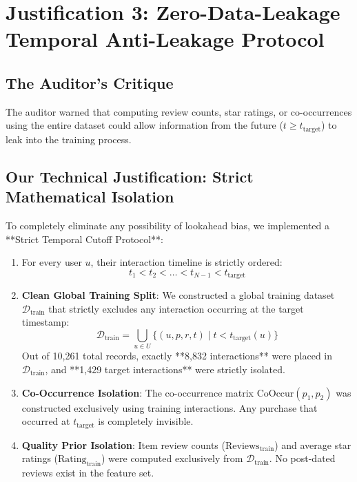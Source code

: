 \documentclass[11pt,a4paper]{article}
\begin{document}
\section{Justification 3: Zero-Data-Leakage Temporal Anti-Leakage Protocol}

\subsection{The Auditor's Critique}
The auditor warned that computing review counts, star ratings, or co-occurrences using the entire dataset could allow information from the future ($t \ge t_{\text{target}}$) to leak into the training process.

\subsection{Our Technical Justification: Strict Mathematical Isolation}
To completely eliminate any possibility of lookahead bias, we implemented a **Strict Temporal Cutoff Protocol**:
\begin{enumerate}
    \item For every user $u$, their interaction timeline is strictly ordered:
    \begin{equation}
        t_1 < t_2 < \dots < t_{N-1} < t_{\text{target}}
    \end{equation}
    \item \textbf{Clean Global Training Split}: We constructed a global training dataset $\mathcal{D}_{\text{train}}$ that strictly excludes any interaction occurring at the target timestamp:
    \begin{equation}
        \mathcal{D}_{\text{train}} = \bigcup_{u \in U} \{ (u, p, r, t) \mid t < t_{\text{target}}(u) \}
    \end{equation}
    Out of 10,261 total records, exactly **8,832 interactions** were placed in $\mathcal{D}_{\text{train}}$, and **1,429 target interactions** were strictly isolated.
    \item \textbf{Co-Occurrence Isolation}: The co-occurrence matrix $\text{CoOccur}(p_1, p_2)$ was constructed exclusively using training interactions. Any purchase that occurred at $t_{\text{target}}$ is completely invisible.
    \item \textbf{Quality Prior Isolation}: Item review counts ($\text{Reviews}_{\text{train}}$) and average star ratings ($\text{Rating}_{\text{train}}$) were computed exclusively from $\mathcal{D}_{\text{train}}$. No post-dated reviews exist in the feature set.
\end{enumerate}
\end{document}

